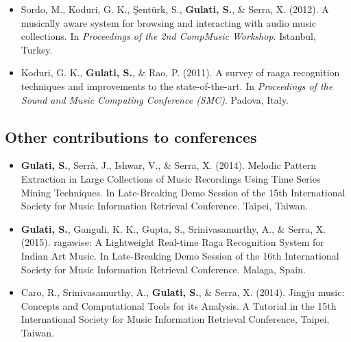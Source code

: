 \begin{itemize}[leftmargin=*]
	\item Sordo, M., Koduri, G. K., \c{S}ent{\"u}rk, S., \textbf{Gulati, S.}, \& Serra, X. (2012). A musically aware system for browsing and interacting with audio music collections. In \textit{Proceedings of the 2nd CompMusic Workshop}. Istanbul, Turkey.
	\item Koduri, G. K., \textbf{Gulati, S.}, \& Rao, P. (2011). A survey of raaga recognition techniques and improvements to the state-of-the-art. In \textit{Proceedings of the Sound and Music Computing Conference (SMC)}. Padova, Italy.
\end{itemize}
%
\subsection*{Other contributions to conferences}
\begin{itemize}[leftmargin=*]
	\item \textbf{Gulati, S.},  Serr{\`a}, J., Ishwar, V., \& Serra, X. (2014). Melodic Pattern Extraction in Large Collections of Music Recordings Using Time Series Mining Techniques. In Late-Breaking Demo Session of the 15th International Society for Music Information Retrieval Conference. Taipei, Taiwan. 
	\item \textbf{Gulati, S.}, Ganguli, K. K., Gupta, S., Srinivasamurthy, A., \& Serra, X. (2015). \gls{ragawise}: A Lightweight Real-time Raga Recognition System for Indian Art Music. In Late-Breaking Demo Session of the 16th International Society for Music Information Retrieval Conference. Malaga, Spain. 
	\item Caro, R., Srinivasamurthy, A., \textbf{Gulati, S.}, \& Serra, X. (2014). Jingju music: Concepts and Computational Tools for its Analysis. A Tutorial in the 15th International Society for Music Information Retrieval Conference, Taipei, Taiwan. 
	
\end{itemize}




